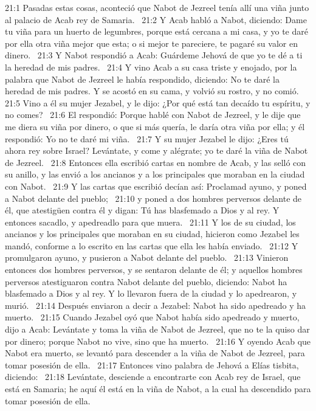 21:1 Pasadas estas cosas, aconteció que Nabot de Jezreel tenía allí una viña junto al palacio de Acab rey de Samaria.  
21:2 Y Acab habló a Nabot, diciendo: Dame tu viña para un huerto de legumbres, porque está cercana a mi casa, y yo te daré por ella otra viña mejor que esta; o si mejor te pareciere, te pagaré su valor en dinero.  
21:3 Y Nabot respondió a Acab: Guárdeme Jehová de que yo te dé a ti la heredad de mis padres.  
21:4 Y vino Acab a su casa triste y enojado, por la palabra que Nabot de Jezreel le había respondido, diciendo: No te daré la heredad de mis padres. Y se acostó en su cama, y volvió su rostro, y no comió.  
21:5 Vino a él su mujer Jezabel, y le dijo: ¿Por qué está tan decaído tu espíritu, y no comes?  
21:6 El respondió: Porque hablé con Nabot de Jezreel, y le dije que me diera su viña por dinero, o que si más quería, le daría otra viña por ella; y él respondió: Yo no te daré mi viña.  
21:7 Y su mujer Jezabel le dijo: ¿Eres tú ahora rey sobre Israel? Levántate, y come y alégrate; yo te daré la viña de Nabot de Jezreel.  
21:8 Entonces ella escribió cartas en nombre de Acab, y las selló con su anillo, y las envió a los ancianos y a los principales que moraban en la ciudad con Nabot.  
21:9 Y las cartas que escribió decían así: Proclamad ayuno, y poned a Nabot delante del pueblo;  
21:10 y poned a dos hombres perversos delante de él, que atestigüen contra él y digan: Tú has blasfemado a Dios y al rey. Y entonces sacadlo, y apedreadlo para que muera.  
21:11 Y los de su ciudad, los ancianos y los principales que moraban en su ciudad, hicieron como Jezabel les mandó, conforme a lo escrito en las cartas que ella les había enviado.  
21:12 Y promulgaron ayuno, y pusieron a Nabot delante del pueblo.  
21:13 Vinieron entonces dos hombres perversos, y se sentaron delante de él; y aquellos hombres perversos atestiguaron contra Nabot delante del pueblo, diciendo: Nabot ha blasfemado a Dios y al rey. Y lo llevaron fuera de la ciudad y lo apedrearon, y murió.  
21:14 Después enviaron a decir a Jezabel: Nabot ha sido apedreado y ha muerto.  
21:15 Cuando Jezabel oyó que Nabot había sido apedreado y muerto, dijo a Acab: Levántate y toma la viña de Nabot de Jezreel, que no te la quiso dar por dinero; porque Nabot no vive, sino que ha muerto.  
21:16 Y oyendo Acab que Nabot era muerto, se levantó para descender a la viña de Nabot de Jezreel, para tomar posesión de ella.  
21:17 Entonces vino palabra de Jehová a Elías tisbita, diciendo:  
21:18 Levántate, desciende a encontrarte con Acab rey de Israel, que está en Samaria; he aquí él está en la viña de Nabot, a la cual ha descendido para tomar posesión de ella.  
